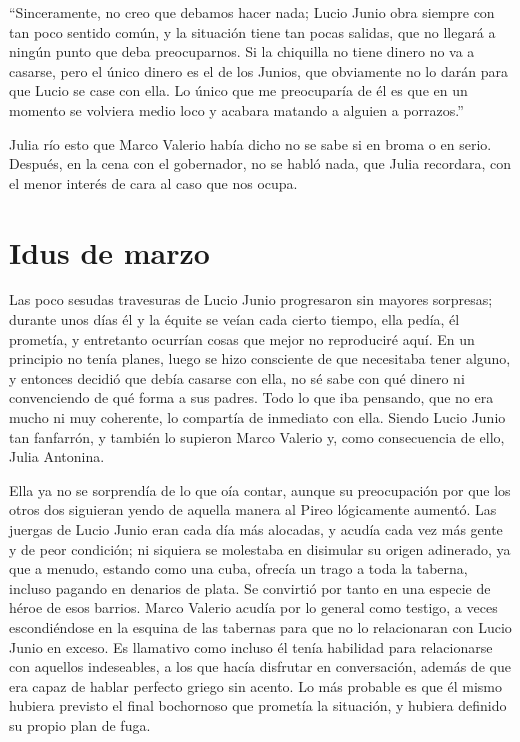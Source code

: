 \documentclass[11pt,openany]{book}
\begin{document}
“Sinceramente, no creo que debamos hacer nada; Lucio Junio obra siempre con tan poco sentido común, y la situación tiene tan pocas salidas, que no llegará a ningún punto que deba preocuparnos. Si la chiquilla no tiene dinero no va a casarse, pero el único dinero es el de los Junios, que obviamente no lo darán para que Lucio se case con ella. Lo único que me preocuparía de él es que en un momento se volviera medio loco y acabara matando a alguien a porrazos.” 

Julia río esto que Marco Valerio había dicho no se sabe si en broma o en serio. Después, en la cena con el gobernador, no se habló nada, que Julia recordara, con el menor interés de cara al caso que nos ocupa. 

\chapter{Idus de marzo}

Las poco sesudas travesuras de Lucio Junio progresaron sin mayores sorpresas; durante unos días él y la équite se veían cada cierto tiempo, ella pedía, él prometía, y entretanto ocurrían cosas que mejor no reproduciré aquí. En un principio no tenía planes, luego se hizo consciente de que necesitaba tener alguno, y entonces decidió que debía casarse con ella, no sé sabe con qué dinero ni convenciendo de qué forma a sus padres. Todo lo que iba pensando, que no era mucho ni muy coherente, lo compartía de inmediato con ella. Siendo Lucio Junio tan fanfarrón, y también lo supieron Marco Valerio y, como consecuencia de ello, Julia Antonina. 

Ella ya no se sorprendía de lo que oía contar, aunque su preocupación por que los otros dos siguieran yendo de aquella manera al Pireo lógicamente aumentó. Las juergas de Lucio Junio eran cada día más alocadas, y acudía cada vez más gente y de peor condición; ni siquiera se molestaba en disimular su origen adinerado, ya que a menudo, estando como una cuba, ofrecía un trago a toda la taberna, incluso pagando en denarios de plata. Se convirtió por tanto en una especie de héroe de esos barrios. Marco Valerio acudía por lo general como testigo, a veces escondiéndose en la esquina de las tabernas para que no lo relacionaran con Lucio Junio en exceso. Es llamativo como incluso él tenía habilidad para relacionarse con aquellos indeseables, a los que hacía disfrutar en conversación, además de que era capaz de hablar perfecto griego sin acento. Lo más probable es que él mismo hubiera previsto el final bochornoso que prometía la situación, y hubiera definido su propio plan de fuga.
\end{document}
